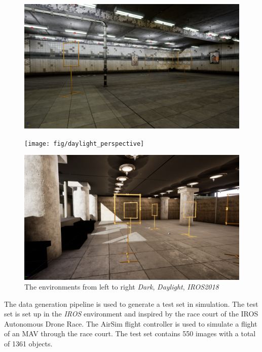 \begin{figure}[hbtp]
	\centering
	\begin{minipage}{0.3\textwidth}
		\includegraphics[width=\textwidth]{fig/basement_perspective}
	\end{minipage}
	\begin{minipage}{0.3\textwidth}
		\texttt{[image: fig/daylight\_perspective]}
	\end{minipage}
	\begin{minipage}{0.3\textwidth}
		\includegraphics[width=\textwidth]{fig/iros_perspective}
	\end{minipage}
	\caption{The environments from left to right \textit{Dark}, \textit{Daylight}, \textit{IROS2018}}
	\label{fig:environments}
\end{figure}

The data generation pipeline is used to generate a test set in simulation. The test set is set up in the \textit{IROS} environment and inspired by the race court of the \ac{IROS} Autonomous Drone Race. The AirSim flight controller is used to simulate a flight of an \ac{MAV} through the race court. The test set contains 550 images with a total of 1361 objects.

